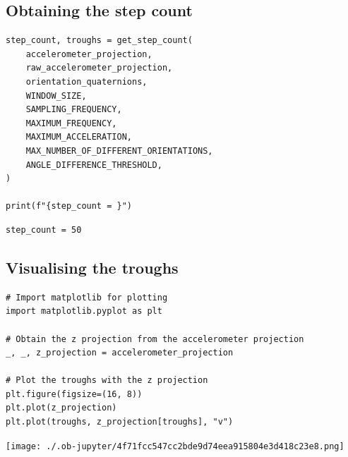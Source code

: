 \documentclass[12pt]{report}
\begin{document}
\subsection{Obtaining the step count}
\label{sec:org750ed99}
\begin{verbatim}
step_count, troughs = get_step_count(
    accelerometer_projection,
    raw_accelerometer_projection,
    orientation_quaternions,
    WINDOW_SIZE,
    SAMPLING_FREQUENCY,
    MAXIMUM_FREQUENCY,
    MAXIMUM_ACCELERATION,
    MAX_NUMBER_OF_DIFFERENT_ORIENTATIONS,
    ANGLE_DIFFERENCE_THRESHOLD,
)

print(f"{step_count = }")
\end{verbatim}

\label{org0258476}
\begin{verbatim}
step_count = 50
\end{verbatim}
\subsection{Visualising the troughs}
\label{sec:org68d054d}
\begin{verbatim}
# Import matplotlib for plotting
import matplotlib.pyplot as plt

# Obtain the z projection from the accelerometer projection
_, _, z_projection = accelerometer_projection

# Plot the troughs with the z projection
plt.figure(figsize=(16, 8))
plt.plot(z_projection)
plt.plot(troughs, z_projection[troughs], "v")
\end{verbatim}

\begin{center}
\texttt{[image: ./.ob-jupyter/4f71fcc547cc2bde9d74eea915804e3d418c23e8.png]}
\label{org0cb4616}
\end{center}
\end{document}
